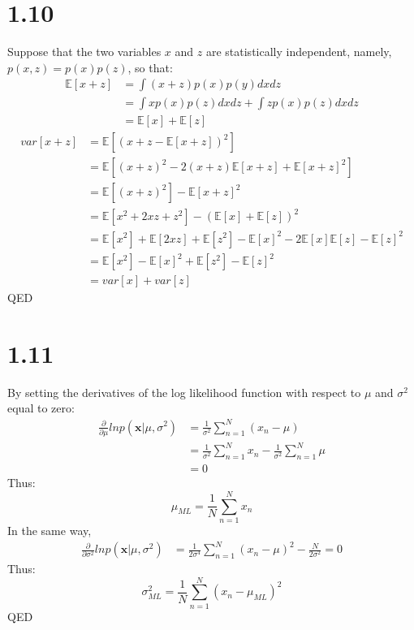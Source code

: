 \documentclass[10pt,a4paper,draft]{book}
\begin{document}
\section*{1.10}
Suppose that the two variables $x$ and $z$ are statistically independent, namely, $p(x,z) = p(x)p(z)$, so that:
\begin{equation}
\begin{aligned}
\mathbb{E}[x+z] &= \int (x+z)p(x)p(y) dxdz \\
&= \int x p(x)p(z) dxdz + \int z p(x)p(z) dxdz \\
&= \mathbb{E}[x] + \mathbb{E}[z] 
\end{aligned}
\end{equation}
\begin{equation}
\begin{aligned}
var[x+z] &= \mathbb{E}[(x+z - \mathbb{E}[x+z])^2] \\ 
&= \mathbb{E}[(x+z)^2 - 2(x+z)\mathbb{E}[x+z] + \mathbb{E}[x+z]^2] \\
&= \mathbb{E}[(x+z)^2] - \mathbb{E}[x+z]^2 \\
&= \mathbb{E}[x^2+2xz+z^2] - (\mathbb{E}[x] + \mathbb{E}[z] )^2 \\
&= \mathbb{E}[x^2]+\mathbb{E}[2xz]+\mathbb{E}[z^2] - \mathbb{E}[x]^2 - 2\mathbb{E}[x]\mathbb{E}[z]- \mathbb{E}[z]^2 \\
&= \mathbb{E}[x^2]- \mathbb{E}[x]^2+\mathbb{E}[z^2]- \mathbb{E}[z]^2\\
&=var[x]+var[z]
\end{aligned}
\end{equation}
QED

\section*{1.11}
By setting the derivatives of the log likelihood function with respect to $\mu$ and $\sigma^2$ equal to zero:
\begin{equation}
\begin{aligned}
\frac{\partial}{\partial \mu} ln p(\bm{x}|\mu,\sigma^2) & = \frac{1}{\sigma^2}\sum_{n=1}^{N} (x_n-\mu) \\
&=  \frac{1}{\sigma^2}\sum_{n=1}^{N} x_n-\frac{1}{\sigma^2}\sum_{n=1}^{N}\mu \\
&= 0
\end{aligned}
\end{equation}
Thus:
\begin{equation}
\mu_{ML} = \frac{1}{N}\sum_{n=1}^{N} x_n
\end{equation}
In the same way,
\begin{equation}
\begin{aligned}
\frac{\partial}{\partial \sigma^2} ln p(\bm{x}|\mu,\sigma^2) & = \frac{1}{2\sigma^4}\sum_{n=1}^{N} (x_n-\mu)^2 - \frac{N}{2\sigma^2} = 0
\end{aligned}
\end{equation}
Thus:
\begin{equation}
\sigma^2_{ML} = \frac{1}{N}\sum_{n=1}^{N} (x_n-\mu_{ML})^2
\end{equation}
QED
\end{document}
